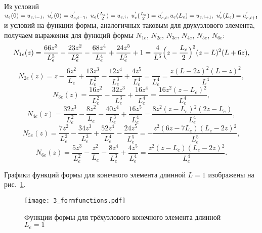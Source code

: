 \documentclass[12pt,a4paper]{article}
\begin{document}
	
Из условий $u_e(0)=u_{e, i-1},~ u_e^{'}(0)=u^{'}_{e, i-1},~ u_{e}(\frac{L_e}{2})=u_{e,i},~ u_{e}^{'}(\frac{L_e}{2})=u^{'}_{e,i},\\
 u_{e}(L_e)=u_{e,i+1},~ u_{e}^{'}(L_e)=u^{'}_{e,i+1}$ и
условий на функции формы, аналогичных таковым для двухузлового элемента,
получаем выражения для функций формы $N_{1e}$, $N_{2e}$, $N_{3e}$, $N_{4e}$, $N_{5e}$, $N_{6e}$:
$$N_{1e}(z)=\frac{66z^{3}}{L_e^{3}}-\frac{23z^{2}}{L_e^{2}}-\frac{68z^{4}}{L_e^{4}}+\frac{24z^{5}}{L_e^{5}}+1= \frac{4}{L^5}\Bigl( z-\frac{L_e}{2} \Bigr)^2(z-L)^2(L+6z),$$
$$N_{2e}(z)=z-\frac{6z^{2}}{L_e}+\frac{13z^{3}}{L_e^{2}}-\frac{12z^{4}}{L_e^{3}}+\frac{4z^{5}}{L_e^{4}}=\frac{}{L_e^4}=\frac{z (L-2 z)^2 (L-z)^2}{L^4},$$
$$N_{3e}(z)=\frac{16z^{2}}{L_e^{2}}-\frac{32z^{3}}{L_e^{3}}+\frac{16z^{4}}{L_e^{4}}=\frac{16 z^2 \left(z-L_e\right){}^2}{L_e^4},$$
$$N_{4e}(z)=\frac{32z^{3}}{L_e^{2}}-\frac{8z^{2}}{L_e}-\frac{40z^{4}}{L_e^{3}}+\frac{16z^{5}}{L_e^{4}}=\frac{8 z^2 \left(z-L_e\right){}^2 \left(2 z-L_e\right)}{L_e^4},$$
$$N_{5e}(z)=\frac{7z^{2}}{L_e^{2}}-\frac{34z^{3}}{L_e^{3}}+\frac{52z^{4}}{L_e^{4}}-\frac{24z^{5}}{L_e^{5}}=-\frac{z^2 \left(6 z-7 L_e\right) \left(L_e-2 z\right){}^2}{L_e^5},$$
$$N_{6e}(z)=\frac{5z^{3}}{L_e^{2}}-\frac{z^{2}}{L_e}-\frac{8z^{4}}{L_e^{3}}+\frac{4z^{5}}{L_e^{4}}=\frac{z^2 \left(z-L_e\right) \left(L_e-2 z\right){}^2}{L_e^4}.$$  

Графики функций формы для конечного элемента длинной $L=1$ изображены на рис.~\ref{fig:3_formfunctions}.

\begin{figure}[H]
		\centering
		\texttt{[image: 3\_formfunctions.pdf]}
		\caption{Функции формы для трёхузлового конечного элемента длинной $L_{e}=1$}
		\label{fig:3_formfunctions}
	\end{figure}
\end{document}
